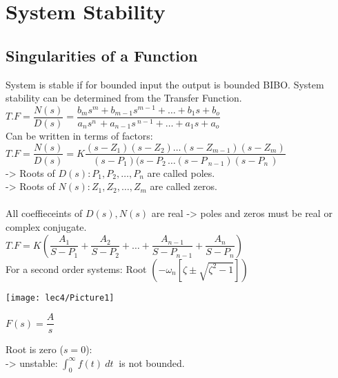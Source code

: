 \setchapterpreamble[u]{\margintoc}
\chapter[System Stability ($4^{th}$ Lecture)]{System Stability}

\section{Singularities of a Function}

System is stable if for bounded input the output is bounded BIBO.
System stability can be determined from the Transfer Function.\\[+1em]

$T.F = \dfrac{N(s)}{D(s)} = \dfrac{b_ms^m+b_{m-1}s^{m-1}+\ldots+b_1s+b_o}{a_ns^{n\ }+a_{n-1}s^{\ n-1}+\ldots+a_1s+a_o}$\\[+1em]

Can be written in terms of factors:\\[+1em]

$T.F = \dfrac{N(s)}{D(s)} = K \dfrac{(s-Z_1)(s-Z_2)\ldots(s-Z_{m-1})(s-Z_m)}{(s-P_1)(s-P_{2\ }\ldots(s-P_{\ n-1})(s-P_{n\ })}$\\[+1em]

-> Roots of $D(s): P_1, P_2, \ldots, P_n$ are called poles.\\
-> Roots of $N(s): Z_1, Z_2, \ldots, Z_m$ are called zeros.\\
\\

All coeffieceints of $D(s), N(s)$ are real -> poles and zeros must be real or complex conjugate.\\[+1em]

$T.F = K ( \dfrac{A_1}{S-P_1} + \dfrac{A_2}{S-P_2} + \ldots + \dfrac{A_{n-1}}{S-P_{n-1}} + \dfrac{A_n}{S-P_n} )$\\[+1em]

For a second order systems: Root $ ( - \omega_n [\zeta \pm \sqrt{\zeta^2-1}] ) $ 

\begin{figure*}[!h]
	\raggedleft
	\texttt{[image: lec4/Picture1]}
\end{figure*}

$F(s)=\dfrac{A}{s}$

Root is zero ($ s = 0 $):\\

-> unstable: $\displaystyle{\int_0^\infty f(t)\ dt\ }$ is not bounded.\\[+1em]

